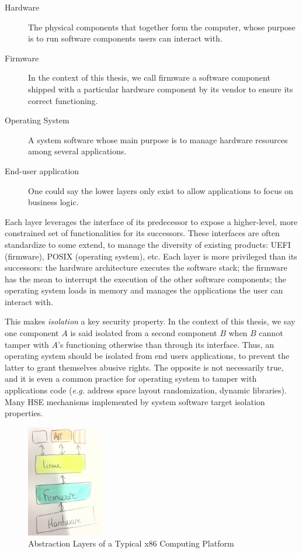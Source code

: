 \begin{description}
\item [Hardware] The physical components that together form the computer, whose
  purpose is to run software components users can interact with.
\item [Firmware] In the context of this thesis, we call firmware a software
  component shipped with a particular hardware component by its vendor to ensure
  its correct functioning.
\item [Operating System] A system software whose main purpose is to manage
  hardware resources among several applications.
\item [End-user application] One could say the lower layers only exist to allow
  applications to focus on business logic.
\end{description}

Each layer leverages the interface of its predecessor to expose a higher-level,
more constrained set of functionalities for its successors.
%
These interfaces are often standardize to some extend, to manage the diversity
of existing products: UEFI (firmware), POSIX (operating system), etc.
%
Each layer is more privileged than its successors:
%
the hardware architecture executes the software stack;
%
the firmware has the mean to interrupt the execution of the other software
components;
%
the operating system loads in memory and manages the applications the user can
interact with.

This makes \emph{isolation} a key security property.
%
In the context of this thesis, we say one component $A$ is said isolated from
a second component $B$ when $B$ cannot tamper with $A$'s functioning otherwise
than through its interface.
%
Thus, an operating system should be isolated from end users applications, to
prevent the latter to grant themselves abusive rights.
%
The opposite is not necessarily true, and it is even a common practice for
operating system to tamper with applications code (\emph{e.g.} address space
layout randomization, dynamic libraries).
%
Many HSE mechanisms implemented by system software target isolation properties.

\begin{figure}
  \centering
  \includegraphics[width=0.3\textwidth]{Figures/computing-platform-1.jpg}
  \caption{Abstraction Layers of a Typical x86 Computing Platform}
  \label{fig:usecase:computing-platform-1}
\end{figure}

